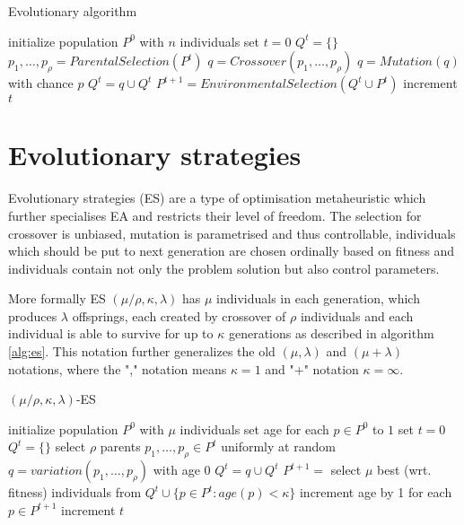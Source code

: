 \begin{algorithm}
    \begin{algorithmic}[1]
    \caption{Evolutionary algorithm}\label{alg:ea}
        \State initialize population $P^0$ with $n$ individuals
        \State set $t=0$
        \Repeat
            \State $Q^t = \{\}$
                \State $p_1,\dots,p_\rho = ParentalSelection(P^t)$
                \State $q = Crossover(p_1,\dots,p_\rho)$ 
                \State $q = Mutation(q)$ with chance $p$
                \State $Q^t = q \cup Q^t$
            \EndFor
            \State $P^{t+1} =EnvironmentalSelection(Q^t\cup  P^t)$
            \State increment $t$
    \end{algorithmic}
    \end{algorithm}

\section{Evolutionary strategies}
\label{sec:es}
Evolutionary strategies (ES) are a type of optimisation metaheuristic which further specialises EA and restricts their level of freedom. The selection for crossover is unbiased, mutation is parametrised and thus controllable, individuals which should be put to next generation are chosen ordinally based on fitness and individuals contain not only the problem solution but also control parameters.

More formally ES $(\mu / \rho,\kappa,\lambda)$ has $\mu$ individuals in each generation, which produces $\lambda$ offsprings, each created by crossover of $\rho$ individuals and each individual is able to survive for up to $\kappa$ generations as described in algorithm \ref{alg:es}. This notation further generalizes the old $(\mu,\lambda)$ and $(\mu+\lambda)$ notations, where the "," notation means $\kappa=1$ and "+" notation $\kappa=\infty$. 
\begin{algorithm}
\begin{algorithmic}[1]
\caption{$(\mu / \rho,\kappa,\lambda)$-ES}
\label{alg:es}
    \State initialize population $P^0$ with $\mu$ individuals
    \State set age for each $p\in P^0$ to $1$
    \State set $t=0$
    \Repeat
        \State $Q^t = \{\}$
            \State select $\rho$ parents $p_1,\dots,p_\rho \in P^t$ uniformly at random
            \State $q = variation(p_1,\dots,p_\rho)$ with age $0$
            \State $Q^t = q \cup Q^t$
        \EndFor
        \State $P^{t+1} =$ select $\mu$ best (wrt. fitness) individuals from $Q^t\cup \{p \in P^t: age(p)<\kappa\}$
        \State increment age by 1 for each $p \in P^{t+1}$
        \State increment $t$
\end{algorithmic}
\end{algorithm}

